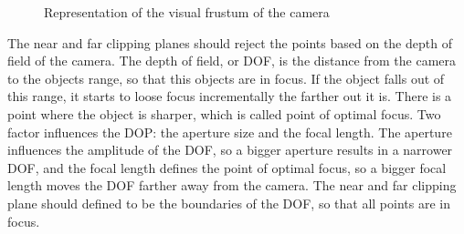 \begin{figure}[h]
    
    \centering

    \caption{Representation of the visual frustum of the camera}
    \label{fig:visual-frustrum-3d}

\end{figure}

The near and far clipping planes should reject the points based on the depth of field of the camera. The depth of field, or DOF, is the distance from the camera to the objects range, so that this objects are in focus. If the object falls out of this range, it starts to loose focus incrementally the farther out it is. There is a point where the object is sharper, which is called point of optimal focus. Two factor influences the DOP: the aperture size and the focal length. The aperture influences the amplitude of the DOF, so a bigger aperture results in a narrower DOF, and the focal length defines the point of optimal focus, so a bigger focal length moves the DOF farther away from the camera. The near and far clipping plane should defined to be the boundaries of the DOF, so that all points are in focus.

